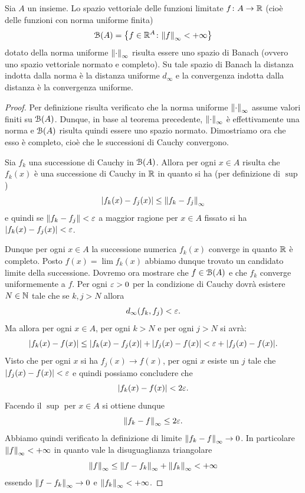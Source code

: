 \begin{theorem}
Sia $A$ un insieme.
Lo spazio vettoriale
delle funzioni limitate $f\colon A \to \mathbb R$
(cioè delle funzioni con norma uniforme finita)
\[
  \mathcal B(A) = {\left\{ f\in \mathbb R^A\colon {\left\Vert f\right\Vert}_\infty < +\infty  \right\}}
\]
dotato della norma uniforme ${\left\Vert \cdot\right\Vert}_\infty$ risulta essere uno spazio di Banach (ovvero uno spazio vettoriale normato e completo).
Su tale spazio di Banach la distanza indotta dalla norma è la distanza uniforme $d_\infty$ e la convergenza indotta dalla distanza è la convergenza uniforme.
\end{theorem}
%
\begin{proof}
Per definizione risulta verificato che la norma uniforme ${\left\Vert \cdot\right\Vert}_\infty$ assume valori finiti su $\mathcal B(A)$.
Dunque, in base al teorema precedente, ${\left\Vert \cdot\right\Vert}_\infty$ è effettivamente una norma e $\mathcal B(A)$ risulta quindi essere uno spazio normato. Dimostriamo ora che esso è completo, cioè che le successioni di Cauchy convergono.

Sia $f_k$ una successione di Cauchy in $\mathcal B(A)$.
Allora per ogni $x\in A$ risulta che $f_k(x)$ è una successione di Cauchy in $\mathbb R$ in quanto si ha (per definizione di $\sup$)
\[
  {\left|f_k(x) - f_j(x)\right|} \le {\left\Vert f_k - f_j\right\Vert}_\infty
\]
e quindi se ${\left\Vert f_k- f_j\right\Vert} < \varepsilon$
a maggior ragione per $x\in A$ fissato si ha ${\left|f_k(x)-f_j(x)\right|} < \varepsilon$.

Dunque per ogni $x\in A$ la successione numerica $f_k(x)$ converge in quanto $\mathbb R$ è completo. Posto $f(x) = \lim f_k(x)$ abbiamo dunque trovato un candidato limite della successione.
Dovremo ora mostrare che $f\in \mathcal B(A)$ e che $f_k$ converge uniformemente a $f$.
Per ogni $\varepsilon>0$ per la condizione di Cauchy dovrà esistere $N\in \mathbb N$ tale che se $k,j>N$ allora
\[
  d_\infty(f_k,f_j) < \varepsilon.
\]
Ma allora per ogni $x\in A$, per ogni $k>N$ e per ogni $j>N$ si avrà:
\[
  {\left|f_k(x) - f(x)\right|} \le {\left|f_k(x) - f_j(x)\right|} +
  {\left|f_j(x) - f(x)\right|} < \varepsilon + {\left|f_j(x)-f(x)\right|}.
\]
Visto che per ogni $x$ si ha $f_j(x) \to f(x)$, per ogni $x$ esiste un $j$ tale che ${\left|f_j(x)-f(x)\right|} < \varepsilon$ e quindi possiamo concludere che
\[
  {\left|f_k(x)-f(x)\right|} < 2\varepsilon.
\]
Facendo il $\sup$ per $x\in A$ si ottiene dunque
\[
  {\left\Vert f_k -f\right\Vert}_\infty \le 2 \varepsilon.
\]
Abbiamo quindi verificato la definizione di limite ${\left\Vert f_k -f\right\Vert}_\infty\to 0$. In particolare ${\left\Vert f\right\Vert}_\infty < +\infty$ in quanto vale la disuguaglianza triangolare
\[
  {\left\Vert f\right\Vert}_\infty \le {\left\Vert f-f_k\right\Vert}_\infty + {\left\Vert f_k\right\Vert}_\infty < +\infty
\]
essendo ${\left\Vert f-f_k\right\Vert}_\infty \to 0$ e ${\left\Vert f_k\right\Vert}_\infty < +\infty$.
\end{proof}

